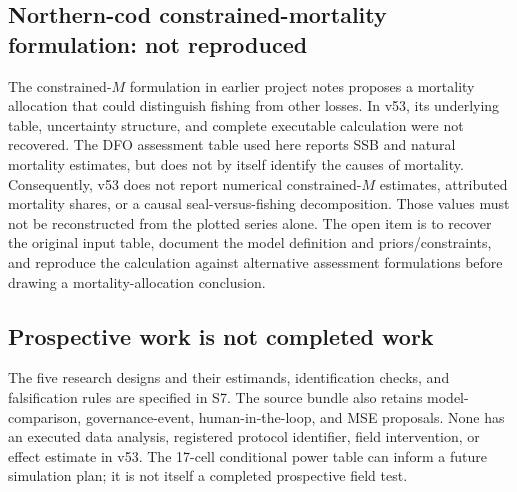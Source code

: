 \subsection{Northern-cod constrained-mortality formulation: not reproduced}

The constrained-\(M\) formulation in earlier project notes proposes a mortality allocation that could distinguish fishing from other losses. In v53, its underlying table, uncertainty structure, and complete executable calculation were not recovered. The DFO assessment table used here reports SSB and natural mortality estimates, but does not by itself identify the causes of mortality. Consequently, v53 does not report numerical constrained-\(M\) estimates, attributed mortality shares, or a causal seal-versus-fishing decomposition. Those values must not be reconstructed from the plotted series alone. The open item is to recover the original input table, document the model definition and priors/constraints, and reproduce the calculation against alternative assessment formulations before drawing a mortality-allocation conclusion.

\subsection{Prospective work is not completed work}

The five research designs and their estimands, identification checks, and falsification rules are specified in S7. The source bundle also retains model-comparison, governance-event, human-in-the-loop, and MSE proposals. None has an executed data analysis, registered protocol identifier, field intervention, or effect estimate in v53. The 17-cell conditional power table can inform a future simulation plan; it is not itself a completed prospective field test.

